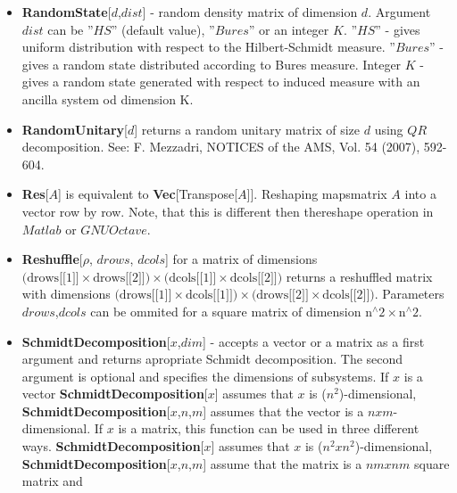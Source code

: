 \begin{itemize}
\item  \textbf{RandomState}[$d$,$dist$] - random density matrix of dimension $d$. Argument $dist$ can be ''$HS$'' (default value), ''$Bures$'' or an integer $K$. \newline{}
\indent{} ''$HS$'' - gives uniform distribution with respect to the Hilbert-Schmidt measure. \newline{}
\indent{} ''$Bures$'' - gives a random state distributed according to Bures measure. \newline{}
\indent{} Integer $K$ - gives a random state generated with respect to induced measure with an ancilla system od dimension K.
\item  \textbf{RandomUnitary}[$d$] returns a random unitary matrix of size $d$ using $QR$ decomposition. See: F. Mezzadri,  NOTICES of the AMS, Vol. 54 (2007), 592-604.
\item  \textbf{Res}[$A$] is equivalent to \textbf{Vec}[Transpose[$A$]]. Reshaping mapsmatrix $A$ into a vector row by row. Note, that this is different then thereshape operation in $Matlab$ or $GNU Octave$.
\item  \textbf{Reshuffle}[$\rho$, {$drows$, $dcols$}] for a matrix of dimensions $\text{(drows[[1]]$\times $drows[[2]])$\times $(dcols[[1]]$\times $dcols[[2]])}$ returns a reshuffled matrix with dimensions $\text{(drows[[1]]$\times $dcols[[1]])$\times $(drows[[2]]$\times $dcols[[2]])}$.\newline{}
Parameters {$drows$,$dcols$} can be ommited for a square matrix of dimension $\text{n${}^{\wedge}$2$\times $n${}^{\wedge}$2}$.
\item  \textbf{SchmidtDecomposition}[$x$,$dim$] - accepts a vector or a matrix as a first argument and returns apropriate Schmidt decomposition. The second argument is optional and specifies the dimensions of subsystems.\newline{}
If $x$ is a vector\newline{}
\indent{} \textbf{SchmidtDecomposition}[$x$] assumes that $x$ is ($n^2$)-dimensional,\newline{}
\indent{} \textbf{SchmidtDecomposition}[$x$,{$n$,$m$}] assumes that the vector is a $n xm$-dimensional.\newline{}
If $x$ is a matrix, this function can be used in three different ways.\newline{}
\indent{} \textbf{SchmidtDecomposition}[$x$] assumes that $x$ is ($n^2xn^2$)-dimensional, \newline{}
\indent{} \textbf{SchmidtDecomposition}[$x$,{$n$,$m$}] assume that the matrix is a $n mxn m$ square matrix and\newline{}

\end{itemize}

